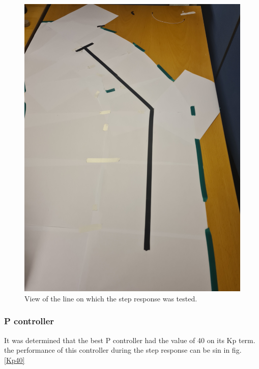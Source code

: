 \begin{figure}[h]
    \centering
    \includegraphics[width=\linewidth]{sections/assets/Step Response.jpg}
    \caption{View of the line on which the step response was tested.}
    \label{Step Response}
\end{figure}

\subsubsection{P controller}
It was determined that the best P controller had the value of 40 on its Kp term. the performance of this controller during the step response can be sin in fig. \ref{Kp40}

